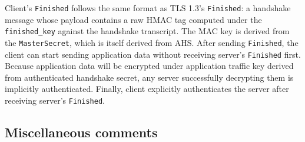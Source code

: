 \documentclass[letterpaper,12pt,titlepage,oneside,final]{book}
\begin{document}
Client's \texttt{Finished} follows the same format as TLS 1.3's \texttt{Finished}: a handshake message whose payload contains a raw HMAC tag computed under the \texttt{finished\_key} against the handshake transcript. 
The MAC key is derived from the \texttt{MasterSecret}, which is itself derived from AHS. 
After sending \texttt{Finished}, the client can start sending application data without receiving server's \texttt{Finished} first.
Because application data will be encrypted under application traffic key derived from authenticated handshake secret, any server successfully decrypting them is implicitly authenticated.
Finally, client explicitly authenticates the server after receiving server's \texttt{Finished}.


\subsection{Miscellaneous comments}



\end{document}
